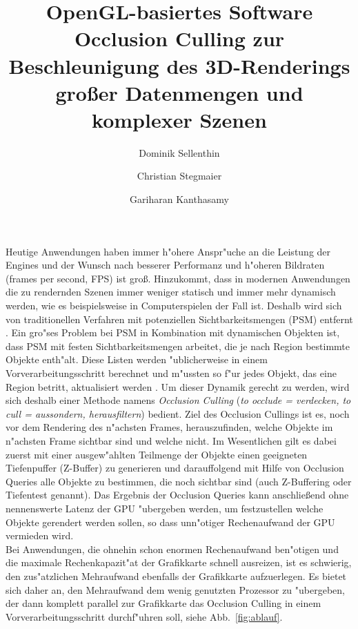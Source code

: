 \documentclass[journal]{vgtc}
\author{Dominik Sellenthin \and Christian Stegmaier \and Gariharan Kanthasamy}
\title{OpenGL-basiertes Software Occlusion Culling zur Beschleunigung des 3D-Renderings gro{\ss}er Datenmengen und komplexer Szenen}
\begin{document}


\maketitle

Heutige Anwendungen haben immer h"ohere Anspr"uche an die Leistung der Engines und der Wunsch nach besserer Performanz und h"oheren Bildraten (frames per second, FPS) ist gro{\ss}.
Hinzukommt, dass in modernen Anwendungen die zu rendernden Szenen immer weniger statisch und immer mehr dynamisch werden, wie es beispielsweise in Computerspielen der Fall ist.
Deshalb wird sich von traditionellen Verfahren mit potenziellen Sichtbarkeitsmengen (PSM) entfernt \cite{MSOC}. Ein gro"ses Problem bei PSM in Kombination mit dynamischen Objekten ist, dass PSM mit festen Sichtbarkeitsmengen arbeitet, die je nach Region bestimmte Objekte enth"alt. Diese Listen werden "ublicherweise in einem Vorverarbeitungsschritt berechnet und m"ussten so f"ur jedes Objekt, das eine Region betritt, aktualisiert werden \cite{PVS}.
Um dieser Dynamik gerecht zu werden, wird sich deshalb einer Methode namens \textit{Occlusion Culling} (\textit{to occlude = verdecken, to cull = aussondern, herausfiltern}) bedient.
Ziel des Occlusion Cullings ist es, noch vor dem Rendering des n"achsten Frames, herauszufinden, welche Objekte im n"achsten Frame sichtbar sind und welche nicht.
Im Wesentlichen gilt es dabei zuerst mit einer ausgew"ahlten Teilmenge der Objekte einen geeigneten Tiefenpuffer (Z-Buffer) zu generieren und darauffolgend mit Hilfe von Occlusion Queries alle Objekte zu bestimmen, die noch sichtbar sind (auch Z-Buffering oder Tiefentest genannt).
Das Ergebnis der Occlusion Queries kann anschlie{\ss}end ohne nennenswerte Latenz der GPU "ubergeben werden, um festzustellen welche Objekte gerendert werden sollen, so dass unn"otiger Rechenaufwand der GPU vermieden wird.\\

Bei Anwendungen, die ohnehin schon enormen Rechenaufwand ben"otigen und die maximale Rechenkapazit"at der Grafikkarte schnell ausreizen, ist es schwierig, den zus"atzlichen Mehraufwand ebenfalls der Grafikkarte aufzuerlegen.
Es bietet sich daher an, den Mehraufwand dem wenig genutzten Prozessor zu "ubergeben, der dann komplett parallel zur Grafikkarte das Occlusion Culling in einem Vorverarbeitungsschritt durchf"uhren soll, siehe Abb.\ \ref{fig:ablauf}.
\end{document}
